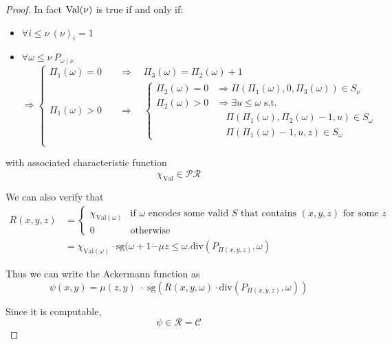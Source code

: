 \begin{theorem}
\begin{proof}
    In fact $\text{Val}(\nu)$ is true if and only if:
    \begin{itemize}
    \item \(\forall i \leq \nu \ (\nu)_i = 1\)
    \item{
        \( \forall \omega \leq \nu \ P_{\omega \; | \; \nu}\)
        \[\Rightarrow \begin{cases}
            \Pi_1(\omega) = 0 \quad & \Rightarrow
            \quad \Pi_3(\omega) = \Pi_2(\omega) + 1 \\
            \Pi_1(\omega) > 0 \quad & \Rightarrow \quad
            \begin{cases}
              \Pi_2(\omega) = 0 & \Rightarrow
              \Pi(\Pi_1(\omega),0,\Pi_3(\omega)) \in S_\nu \\
              \Pi_2(\omega) > 0 & \Rightarrow
              \exists u \leq \omega \text{ s.t. } \\
              & \quad \Pi(\Pi_1(\omega), \Pi_2(\omega)-1,u) \in S_\omega \\
              & \quad \Pi(\Pi_1(\omega)-1, u,z) \in S_\omega
            \end{cases}
            \\
          \end{cases}
        \]
      }
    \end{itemize}
    with associated characteristic function
    \[\chi_{\text{Val}} \in \mathcal{PR}\]

    We can also verify that
    \begin{align*}
      R(x,y,z) &= \begin{cases}
        \chi_{\text{Val}(\omega)} & \text{if $\omega$ encodes some
          valid $S$ that contains $(x,y,z)$ for some $z$} \\
        0 & \text{otherwise}
      \end{cases} \\
      &= \chi_{\text{Val}(\omega)} \cdot \text{sg} (\omega + 1
      \dot{-} \mu z \leq \omega . \text{div}(P_{\Pi(x,y,z)}, \omega)
    \end{align*}

    Thus we can write the Ackermann function as
    \[
      \psi(x,y) = \mu (z,y) \; \cdot \; \overline{\text{sg}}(R(x,y,\omega)
      \cdot \text{div}(P_{\Pi(x,y,z)}, \omega))
    \]

    Since it is computable,
    \[
      \psi \in \mathcal{R} = \mathcal{C}
    \]

  \end{proof}
\end{theorem}


